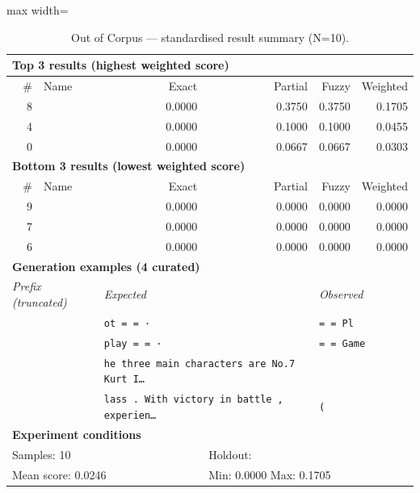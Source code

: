 \begin{table}[htbp]
\centering
\caption{Out of Corpus — standardised result summary (N=10).}
\label{tab:out_of_corpus_summary}
\begin{adjustbox}{max width=\textwidth}
\begin{tabular}{r p{5cm} r r r r}
\toprule
\multicolumn{6}{l}{\textbf{Top 3 results (highest weighted score)}} \\
\midrule
\# & Name & Exact & Partial & Fuzzy & Weighted \\
\midrule
8 &  & 0.0000 & 0.3750 & 0.3750 & 0.1705 \\
4 &  & 0.0000 & 0.1000 & 0.1000 & 0.0455 \\
0 &  & 0.0000 & 0.0667 & 0.0667 & 0.0303 \\
\midrule
\multicolumn{6}{l}{\textbf{Bottom 3 results (lowest weighted score)}} \\
\midrule
\# & Name & Exact & Partial & Fuzzy & Weighted \\
\midrule
9 &  & 0.0000 & 0.0000 & 0.0000 & 0.0000 \\
7 &  & 0.0000 & 0.0000 & 0.0000 & 0.0000 \\
6 &  & 0.0000 & 0.0000 & 0.0000 & 0.0000 \\
\midrule
\multicolumn{6}{l}{\textbf{Generation examples (4 curated)}} \\
\midrule
\multicolumn{2}{l}{\textit{Prefix (truncated)}} & \multicolumn{2}{l}{\textit{Expected}} & \multicolumn{2}{l}{\textit{Observed}} \\
\midrule
\multicolumn{2}{l}{\texttt{}} & \multicolumn{2}{l}{\texttt{ot = = ·}} & \multicolumn{2}{l}{\texttt{= = Pl}} \\
\multicolumn{2}{l}{\texttt{}} & \multicolumn{2}{l}{\texttt{play = = ·}} & \multicolumn{2}{l}{\texttt{= = Game}} \\
\multicolumn{2}{l}{\texttt{}} & \multicolumn{2}{l}{\texttt{he three main characters are No.7 Kurt I\ldots}} & \multicolumn{2}{l}{\texttt{}} \\
\multicolumn{2}{l}{\texttt{}} & \multicolumn{2}{l}{\texttt{lass . With victory in battle , experien\ldots}} & \multicolumn{2}{l}{\texttt{(}} \\
\midrule
\multicolumn{6}{l}{\textbf{Experiment conditions}} \\
\midrule
\multicolumn{3}{l}{Samples: 10} & \multicolumn{3}{l}{Holdout: } \\
\multicolumn{3}{l}{Mean score: 0.0246} & \multicolumn{3}{l}{Min: 0.0000 \quad Max: 0.1705} \\

\end{tabular}
\end{adjustbox}
\end{table}
